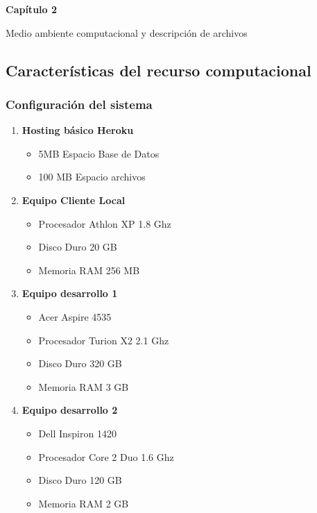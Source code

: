 \documentclass{beamer}
\begin{document}
\begin{frame}
\textbf{Capítulo 2}

\mbox{}

Medio ambiente computacional y descripción de archivos
\end{frame}

\subsection{Características del recurso computacional}

\begin{frame}
\frametitle{Configuración del sistema}

\begin{enumerate}
\item \textbf{Hosting básico Heroku}
\begin{itemize}
\pause
\item 5MB Espacio Base de Datos 
\item 100 MB Espacio archivos\pause
\end{itemize}

\item \textbf{Equipo Cliente Local}
\begin{itemize}
\item Procesador Athlon XP 1.8 Ghz
\item Disco Duro 20 GB
\item Memoria RAM 256 MB \pause
\end{itemize}

\item \textbf{Equipo desarrollo 1}
\begin{itemize}
\item Acer Aspire 4535
\item Procesador Turion X2 2.1 Ghz
\item Disco Duro 320 GB
\item Memoria RAM 3 GB \pause
\end{itemize}

\item \textbf{Equipo desarrollo 2}
\begin{itemize}
\item Dell Inspiron 1420
\item Procesador Core 2 Duo 1.6 Ghz
\item Disco Duro 120 GB
\item Memoria RAM 2 GB
\end{itemize}

\end{enumerate}

\end{frame}
\end{document}
